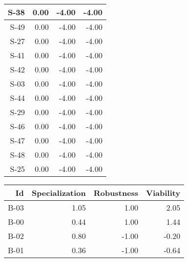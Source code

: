 \begin{tabular}{ | r | r | r | r | }
    \hline
                  S-38  &            0.00  &           -4.00  &           -4.00  \\
    \hline
                  S-49  &            0.00  &           -4.00  &           -4.00  \\
    \hline
                  S-27  &            0.00  &           -4.00  &           -4.00  \\
    \hline
                  S-41  &            0.00  &           -4.00  &           -4.00  \\
    \hline
                  S-42  &            0.00  &           -4.00  &           -4.00  \\
    \hline
                  S-03  &            0.00  &           -4.00  &           -4.00  \\
    \hline
                  S-44  &            0.00  &           -4.00  &           -4.00  \\
    \hline
                  S-29  &            0.00  &           -4.00  &           -4.00  \\
    \hline
                  S-46  &            0.00  &           -4.00  &           -4.00  \\
    \hline
                  S-47  &            0.00  &           -4.00  &           -4.00  \\
    \hline
                  S-48  &            0.00  &           -4.00  &           -4.00  \\
    \hline
                  S-25  &            0.00  &           -4.00  &           -4.00  \\
    \hline
\end{tabular}


\begin{tabular}{ | r | r | r | r | }
    \hline
                    Id  &  Specialization  &      Robustness  &       Viability  \\
    \hline
    \hline
                  B-03  &            1.05  &            1.00  &            2.05  \\
    \hline
                  B-00  &            0.44  &            1.00  &            1.44  \\
    \hline
                  B-02  &            0.80  &           -1.00  &           -0.20  \\
    \hline
                  B-01  &            0.36  &           -1.00  &           -0.64  \\
    \hline
\end{tabular}



